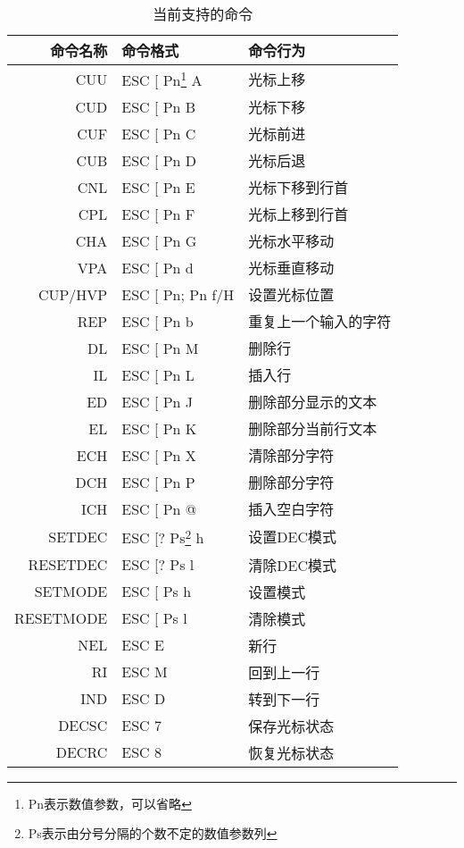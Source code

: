 \begin{longtable}{|r|l|l|}
	\caption{当前支持的命令}
\label{tab:supported-commands} \\

\hline
\textbf{命令名称} & \textbf{命令格式} & \textbf{命令行为} \\ \hline
CUU & ESC [ Pn\footnote{Pn表示数值参数，可以省略} A & 光标上移\\ \hline
CUD & ESC [ Pn B & 光标下移\\ \hline
CUF & ESC [ Pn C & 光标前进\\ \hline
CUB & ESC [ Pn D & 光标后退\\ \hline
CNL & ESC [ Pn E & 光标下移到行首\\ \hline
CPL & ESC [ Pn F & 光标上移到行首\\ \hline
CHA & ESC [ Pn G & 光标水平移动\\ \hline
VPA & ESC [ Pn d & 光标垂直移动\\ \hline
CUP/HVP & ESC [ Pn; Pn f/H & 设置光标位置\\ \hline \hline

REP & ESC [ Pn b & 重复上一个输入的字符 \\ \hline
DL & ESC [ Pn M &删除行 \\ \hline
IL & ESC [ Pn L &插入行 \\ \hline
ED &ESC [ Pn J &删除部分显示的文本 \\ \hline
EL &ESC [ Pn K &删除部分当前行文本 \\ \hline
ECH & ESC [ Pn X &清除部分字符 \\ \hline
DCH & ESC [ Pn P &删除部分字符 \\ \hline
ICH & ESC [ Pn @ &插入空白字符 \\ \hline \hline

SETDEC & ESC [? Ps\footnote{Ps表示由分号分隔的个数不定的数值参数列} h & 设置DEC模式 \\ \hline
RESETDEC & ESC [? Ps l & 清除DEC模式 \\ \hline
SETMODE &ESC [ Ps h & 设置模式 \\ \hline
RESETMODE & ESC [ Ps l &清除模式 \\ \hline \hline

NEL & ESC E &新行 \\ \hline
RI & ESC M & 回到上一行 \\ \hline
IND & ESC D &转到下一行 \\ \hline
DECSC & ESC 7& 保存光标状态 \\ \hline
DECRC &ESC 8& 恢复光标状态 \\ \hline \hline


\end{longtable}
